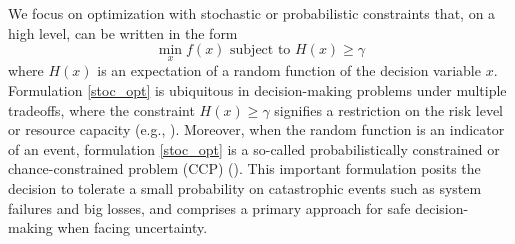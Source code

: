 \documentclass[mnsc,blindrev]{informs4} %
\begin{document}
We focus on optimization with stochastic or probabilistic constraints that, on a high level, can be written in the form
\begin{equation}
\min_x f(x)\text{\ \ subject to\ \ }H(x)\geq\gamma\label{stoc_opt} %
\end{equation}
where $H(x)$ is an expectation of a random function of the decision variable $x$. Formulation \eqref{stoc_opt} is ubiquitous in decision-making problems under multiple tradeoffs, where the constraint $H(x)\geq\gamma$ signifies a restriction on the risk level or resource capacity (e.g., \cite{atlason2004call,krokhmal2002portfolio}). Moreover, when the random function is an indicator of an event, formulation \eqref{stoc_opt} is a so-called probabilistically constrained or chance-constrained problem (CCP) (\cite{prekopa2003probabilistic}). This important formulation posits the decision to tolerate a small probability on catastrophic events such as system failures and big losses, and comprises a primary approach for safe decision-making when facing uncertainty.



\end{document}

